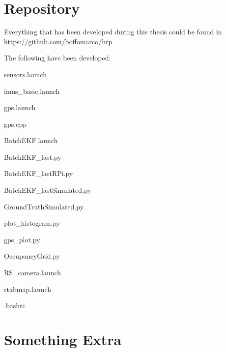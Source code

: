 \chapter{Repository}

Everything that has been developed during this thesis could be found in \url{https://github.com/boffomarco/hrp}

The following have been developed:

sensors.launch

imus\_basic.launch

gps.launch

gps.cpp

BatchEKF.launch

BatchEKF\_last.py

BatchEKF\_lastRPi.py

BatchEKF\_lastSimulated.py

GroundTruthSimulated.py

plot\_histogram.py

gps\_plot.py

OccupancyGrid.py

RS\_camera.launch

rtabmap.launch

.bashrc



\chapter{Something Extra}
